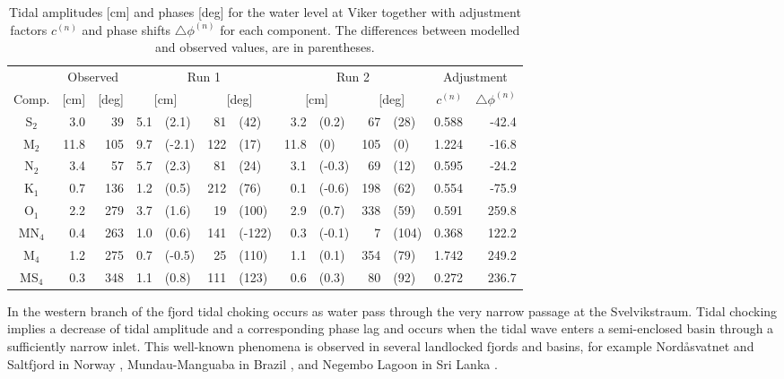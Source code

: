 \begin{table}[ht]
\caption{Tidal amplitudes [cm] and phases [deg] for the water level at Viker  together with adjustment factors $c^{(n)}$ and phase shifts $\triangle \phi^{(n)}$ for each component. The differences between modelled and observed values, are in parentheses.}
\label{tab:Viker}
\centering
\begin{tabular}{crrr@{ }lr@{ }lr@{ }lr@{ }lrr} \hline
      & \multicolumn{2}{c}{Observed} & \multicolumn{4}{c}{Run 1} & \multicolumn{4}{c}{Run 2} & \multicolumn{2}{c}{Adjustment} \\
Comp. & [cm] & [deg] & \multicolumn{2}{c}{[cm]} & \multicolumn{2}{c}{[deg]} & \multicolumn{2}{c}{[cm]} & \multicolumn{2}{c}{[deg]} & $c^{(n)}$ & $\triangle \phi^{(n)}$  \\ \hline 
S$_2$  &   3.0 &  39 &  5.1 & (2.1)  &  81 & (42)   &  3.2 & (0.2)  &  67 & (28)  &  0.588 &   -42.4   \\
M$_2$  &  11.8 & 105 &  9.7 & (-2.1) & 122 & (17)   & 11.8 & (0)    & 105 & (0)   &  1.224 &   -16.8   \\
N$_2$  &   3.4 &  57 &  5.7 & (2.3)  &  81 & (24)   &  3.1 & (-0.3) &  69 & (12)  &  0.595 &   -24.2   \\
K$_1$  &   0.7 & 136 &  1.2 & (0.5)  & 212 & (76)   &  0.1 & (-0.6) & 198 & (62)  &  0.554 &   -75.9   \\
O$_1$  &   2.2 & 279 &  3.7 & (1.6)  &  19 & (100)  &  2.9 & (0.7)  & 338 & (59)  &  0.591 &   259.8   \\
MN$_4$ &   0.4 & 263 &  1.0 & (0.6)  & 141 & (-122) &  0.3 & (-0.1) &   7 & (104) &  0.368 &   122.2   \\
M$_4$  &   1.2 & 275 &  0.7 & (-0.5) &  25 & (110)  &  1.1 & (0.1)  & 354 & (79)  &  1.742 &   249.2   \\
MS$_4$ &   0.3 & 348 &  1.1 & (0.8)  & 111 & (123)  &  0.6 & (0.3)  &  80 & (92)  &  0.272 &   236.7   \\ \hline
\end{tabular}
\end{table}

In the western branch of the fjord tidal choking occurs as water pass through the very narrow passage at the Svelvikstraum. Tidal chocking implies a decrease of tidal amplitude and a corresponding phase lag \cite[]{stigebrandt80} and occurs when the tidal wave enters a semi-enclosed basin through a sufficiently narrow inlet. This well-known phenomena is observed in several landlocked fjords and basins, for example Nord{\aa}svatnet and Saltfjord in Norway \cite[]{glenne63,eliassen01}, Mundau-Manguaba in Brazil \cite[]{oliveira93}, and Negembo Lagoon in Sri Lanka \cite[]{rydberg96}. 


